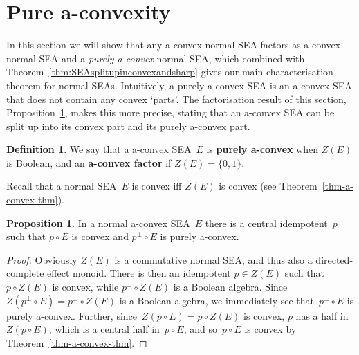 \documentclass[a4paper, onecolumn, accepted=2020-12-22]{quantumarticle}
\newcommand\Define[1]{\textbf{#1}}
\newcommand{\mult}{\mathop{\circ}}
\newcounter{counter}
\theoremstyle{definition}
\newtheorem{proposition}[counter]{Proposition}
\newtheorem{definition}[counter]{Definition}
\begin{document}
\section{Pure a-convexity}\label{sec:purea-convex}
In this section we will show that
  any a-convex normal SEA
  factors as a convex normal SEA and a \emph{purely a-convex} normal SEA,
  which combined with Theorem~\ref{thm:SEAsplitupinconvexandsharp} gives our main characterisation theorem for normal SEAs.
	Intuitively, a purely a-convex SEA is an a-convex SEA that does not contain any convex `parts'. The factorisation result of this section, Proposition~\ref{prop:a-convexsplitinconvexandsharp}, makes this more precise, stating that an a-convex SEA can be split up into its convex part and its purely a-convex part.
\begin{definition}
We say that a a-convex SEA~$E$
is \Define{purely a-convex} when $Z(E)$ is Boolean,
and
an \Define{a-convex factor} if $Z(E) = \{0,1\}$.
\end{definition}
Recall that a normal SEA~$E$ is convex iff $Z(E)$ is convex
(see Theorem~\ref{thm-a-convex-thm}).
\begin{proposition}\label{prop:a-convexsplitinconvexandsharp}
In a normal a-convex SEA~$E$
there is a central idempotent~$p$ such that
$p\mult E$ is convex
and $p^\perp \mult E$ is purely a-convex.
\end{proposition}
\begin{proof}
Obviously $Z(E)$ is a commutative normal SEA, and thus also a directed-complete effect monoid.
There is then an idempotent $p\in Z(E)$ such that $p\mult Z(E)$ is convex, 
while $p^\perp\mult Z(E)$ is a Boolean algebra. 
Since $Z(p^\perp \mult E) = p^\perp \mult Z(E)$ is a Boolean algebra,
  we immediately see that~$p^\perp \mult E$ is purely a-convex.
Further, since~$Z(p\mult E)=p\mult Z(E)$ is convex,
  $p$ has a half in~$Z(p\mult E)$,
 which is a central half in~$p\mult E$,
  and so~$p\mult E$ is convex
  by Theorem~\ref{thm-a-convex-thm}.
\end{proof}
\end{document}
